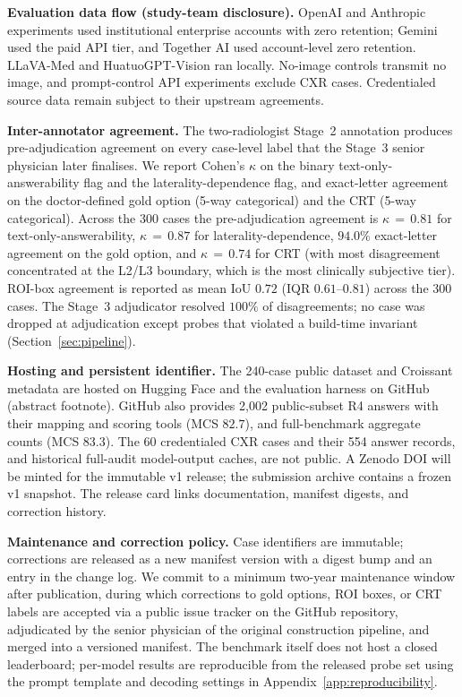 \documentclass{article}
\begin{document}
\textbf{Evaluation data flow (study-team disclosure).} OpenAI and Anthropic experiments used institutional enterprise accounts with zero retention; Gemini used the paid API tier, and Together AI used account-level zero retention. LLaVA-Med and HuatuoGPT-Vision ran locally. No-image controls transmit no image, and prompt-control API experiments exclude CXR cases. Credentialed source data remain subject to their upstream agreements.

\textbf{Inter-annotator agreement.} The two-radiologist Stage~2 annotation produces pre-adjudication agreement on every case-level label that the Stage~3 senior physician later finalises. We report Cohen's $\kappa$ on the binary text-only-answerability flag and the laterality-dependence flag, and exact-letter agreement on the doctor-defined gold option (5-way categorical) and the CRT (5-way categorical). Across the 300 cases the pre-adjudication agreement is $\kappa\,{=}\,0.81$ for text-only-answerability, $\kappa\,{=}\,0.87$ for laterality-dependence, $94.0\%$ exact-letter agreement on the gold option, and $\kappa\,{=}\,0.74$ for CRT (with most disagreement concentrated at the L2/L3 boundary, which is the most clinically subjective tier). ROI-box agreement is reported as mean IoU $0.72$ (IQR $0.61$--$0.81$) across the 300 cases. The Stage~3 adjudicator resolved $100\%$ of disagreements; no case was dropped at adjudication except probes that violated a build-time invariant (Section~\ref{sec:pipeline}).

\textbf{Hosting and persistent identifier.} The 240-case public dataset and Croissant metadata are hosted on Hugging Face and the evaluation harness on GitHub (abstract footnote). GitHub also provides 2{,}002 public-subset \textsc{R4} answers with their mapping and scoring tools (MCS $82.7$), and full-benchmark aggregate counts (MCS $83.3$). The 60 credentialed CXR cases and their 554 answer records, and historical full-audit model-output caches, are not public. A Zenodo DOI will be minted for the immutable v1 release; the submission archive contains a frozen v1 snapshot. The release card links documentation, manifest digests, and correction history.

\textbf{Maintenance and correction policy.} Case identifiers are immutable; corrections are released as a new manifest version with a digest bump and an entry in the change log. We commit to a minimum two-year maintenance window after publication, during which corrections to gold options, ROI boxes, or CRT labels are accepted via a public issue tracker on the GitHub repository, adjudicated by the senior physician of the original construction pipeline, and merged into a versioned manifest. The benchmark itself does not host a closed leaderboard; per-model results are reproducible from the released probe set using the prompt template and decoding settings in Appendix~\ref{app:reproducibility}.
\end{document}
